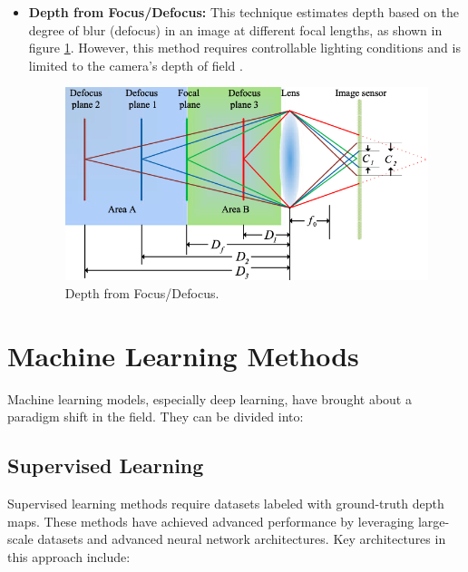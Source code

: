 \begin{itemize}
    \item \textbf{Depth from Focus/Defocus:} This technique estimates depth based on the degree of blur (defocus) in an image at different focal lengths, as shown in figure \ref{fig:dfd_diagram}. However, this method requires controllable lighting conditions and is limited to the camera's depth of field \cite{pentland1987new}.
    
    \begin{figure}[htbp!]
        \centering
        \includegraphics[width=\textwidth]{images/dfd_diagram.png}
        \caption{Depth from Focus/Defocus.}
        \label{fig:dfd_diagram}
    \end{figure}
\end{itemize}

\section{Machine Learning Methods}
\label{sec:deep_learning_methods}

Machine learning models, especially deep learning, have brought about a paradigm shift in the field. They can be divided into:

\subsection{Supervised Learning}
\label{subsec:supervised}

Supervised learning methods require datasets labeled with ground-truth depth maps. These methods have achieved advanced performance by leveraging large-scale datasets and advanced neural network architectures. Key architectures in this approach include:

